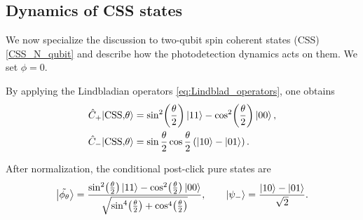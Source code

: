 \subsection{Dynamics of CSS states}

We now specialize the discussion to two-qubit spin coherent states (CSS) \eqref{CSS_N_qubit} and describe how the
photodetection dynamics acts on them. We set $\phi=0$.

By applying the Lindbladian operators \eqref{eq:Lindblad_operators}, one obtains
\begin{align}
	\hat C_+ |\mathrm{CSS,}\theta\rangle
	&=
	\sin^{2}\!\left(\frac{\theta}{2}\right)\ket{11}
	-
	\cos^{2}\!\left(\frac{\theta}{2}\right)\ket{00},
	\label{eq:CSS_postjump_plus_unnorm_clean}\\
	\hat C_- |\mathrm{CSS,}\theta\rangle
	&=
	\sin\frac{\theta}{2}\cos\frac{\theta}{2}
	\left(
	\ket{10}-\ket{01}
	\right).
	\label{eq:CSS_postjump_minus_unnorm_clean}
\end{align}

After normalization, the conditional post-click pure states are
\begin{equation}
	\ket{\tilde{\phi_\theta}}
	=
	\frac{
		\sin^{2}\!\left(\frac{\theta}{2}\right)\ket{11}
		-
		\cos^{2}\!\left(\frac{\theta}{2}\right)\ket{00}
	}{
		\sqrt{
			\sin^{4}\!\left(\frac{\theta}{2}\right)
			+
			\cos^{4}\!\left(\frac{\theta}{2}\right)
		}
	},
	\qquad
	\ket{\psi_-}
	=
	\frac{\ket{10}-\ket{01}}{\sqrt{2}}.
	\label{eq:CSS_postjump_normalized_clean}
\end{equation}

